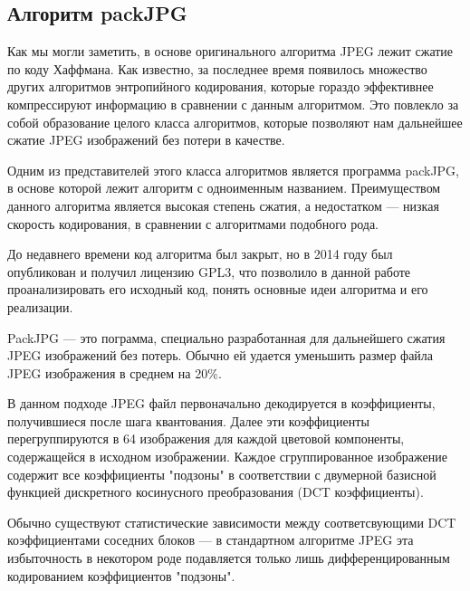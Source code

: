 \documentclass{matmex-diploma-custom}
\begin{document}


\subsection{Алгоритм packJPG}

Как мы могли заметить, в основе оригинального алгоритма JPEG лежит сжатие по коду Хаффмана. Как известно, за последнее время появилось множество других алгоритмов энтропийного кодирования, которые гораздо эффективнее компрессируют информацию в сравнении с данным алгоритмом. Это повлекло за собой образование целого класса алгоритмов, которые позволяют нам дальнейшее сжатие JPEG изображений без  потери в качестве.

Одним из представителей этого класса алгоритмов является программа packJPG, в основе которой лежит алгоритм с одноименным названием. Преимуществом данного алгоритма является высокая степень сжатия, а недостатком  --- низкая скорость кодирования, в сравнении с алгоритмами подобного рода.

До недавнего времени код алгоритма был закрыт, но в 2014 году был опубликован и получил лицензию GPL3, что позволило в данной работе проанализировать его исходный код, понять основные идеи алгоритма и его реализации.

PackJPG --- это пограмма, специально разработанная для дальнейшего сжатия JPEG изображений без потерь. Обычно ей удается уменьшить размер файла JPEG изображения  в среднем на 20\%.

В данном подходе JPEG файл первоначально декодируется в коэффициенты, получившиеся после шага квантования.
Далее эти коэффициенты перегруппируются в 64 изображения для каждой цветовой компоненты, содержащейся в исходном изображении. Каждое сгруппированное изображение содержит все коэффициенты "подзоны" в соответствии с  двумерной  базисной функцией дискретного косинусного преобразования (DCT коэффициенты).

Обычно существуют статистические зависимости между соответсвующими DCT коэффициентами соседних блоков --- в стандартном алгоритме JPEG эта избыточность в некотором роде подавляется только лишь дифференцированным кодированием коэффициентов "подзоны".
\end{document}
